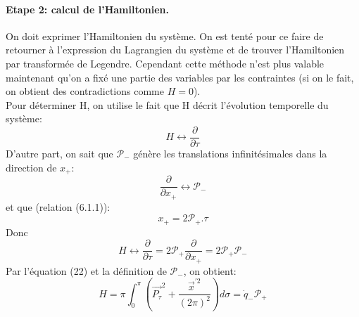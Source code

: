 \documentclass[a4paper,12pt]{article}
\def\vecx{\vec{x}}
\def\CP{\mathcal{P}}
\def\pt{P_\tau}
\def\vecpt{\vec{\pt}}
\begin{document}
\paragraph*{Etape 2: calcul de l'Hamiltonien.}
On doit exprimer l'Hamiltonien du système. On est tenté pour ce faire de retourner à l'expression du Lagrangien du système et de trouver l'Hamiltonien par transformée de Legendre. Cependant cette méthode n'est plus valable maintenant qu'on a fixé une partie des variables par les contraintes (si on le fait, on obtient des contradictions comme $H=0$).\\
Pour déterminer H, on utilise le fait que H décrit l'évolution temporelle du système:
$$H \leftrightarrow \frac{\partial}{\partial \tau}$$
D'autre part, on sait que $\CP_-$ génère les translations infinitésimales dans la direction de $x_+$: $$\frac{\partial}{\partial x_+}\leftrightarrow \CP_-$$
et que (relation (6.1.1)): $$x_+=2\CP_+.\tau$$ Donc $$H \leftrightarrow \frac{\partial}{\partial \tau}=2\CP_+\frac{\partial}{\partial x_+}=2\CP_+\CP_- $$
Par l'équation (22) et la définition de $\CP_-$, on obtient: $$H=\pi\int_0^\pi\left( \vecpt^2 +\frac{\vecx^{'2}}{(2\pi)^2}\right)d\sigma=\dot{q}_-\CP_+ $$
\end{document}
